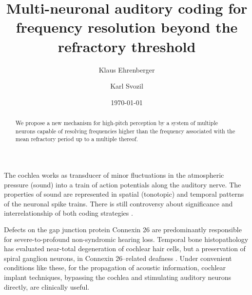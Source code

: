 \documentclass[%
 preprint,
 showpacs,
 showkeys,
 preprintnumbers,
 amsmath,amssymb,
 aps,
 prl,
  longbibliography,
 ]{revtex4-1}
\begin{document}
\title{Multi-neuronal auditory coding for frequency resolution beyond the refractory threshold}

\author{Klaus Ehrenberger}

\author{Karl Svozil}
 


\date{\today}

\begin{abstract}
We propose a new mechanism for high-pitch perception by a system of multiple neurons capable of resolving frequencies higher than the frequency associated with the mean refractory period up to a multiple thereof.
\end{abstract}



\maketitle


The cochlea  works as transducer of minor fluctuations in the atmospheric pressure (sound)
into a train of action potentials along the auditory nerve.
The properties of sound are represented in spatial (tonotopic)
and temporal patterns of the neuronal spike trains.
There is still controversy about significance and interrelationship of both coding strategies
\cite{grothe-2000,oxenham-2004}.

Defects on the gap junction protein Connexin 26 are predominantly
responsible for severe-to-profound  non-syndromic hearing loss.
Temporal bone histopathology has evaluated near-total degeneration of cochlear
hair cells, but a preservation of  spiral ganglion neurons,
in Connexin 26--related deafness \cite{jun-2000}.
Under convenient conditions like these, for the propagation of acoustic information,
cochlear implant techniques, bypassing the cochlea and stimulating auditory neurons directly,
are clinically useful.
\end{document}
